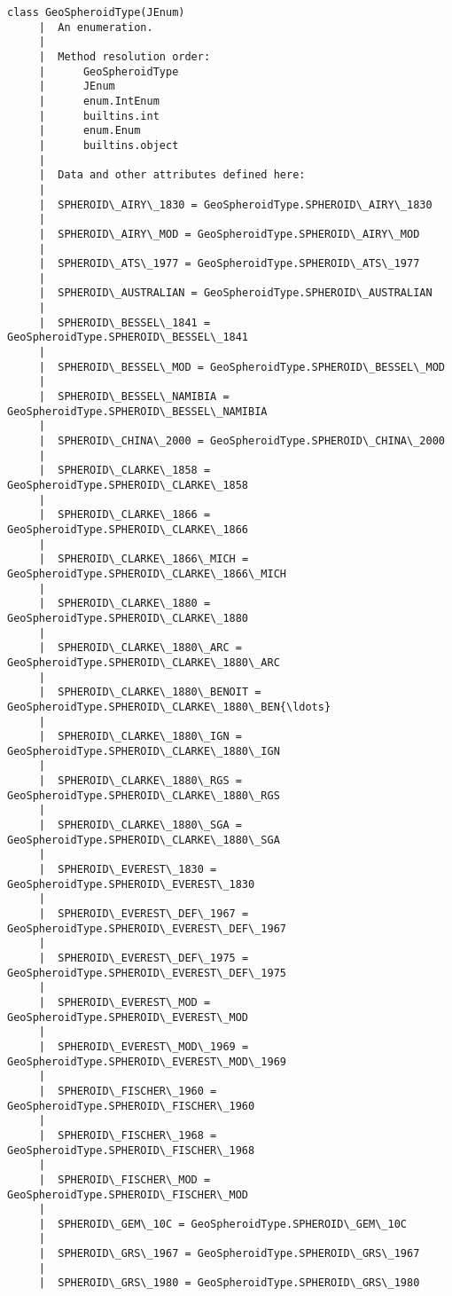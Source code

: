 \documentclass[11pt]{article}
\begin{document}
\begin{Verbatim}[commandchars=\\\{\}]
    class GeoSpheroidType(JEnum)
     |  An enumeration.
     |  
     |  Method resolution order:
     |      GeoSpheroidType
     |      JEnum
     |      enum.IntEnum
     |      builtins.int
     |      enum.Enum
     |      builtins.object
     |  
     |  Data and other attributes defined here:
     |  
     |  SPHEROID\_AIRY\_1830 = GeoSpheroidType.SPHEROID\_AIRY\_1830
     |  
     |  SPHEROID\_AIRY\_MOD = GeoSpheroidType.SPHEROID\_AIRY\_MOD
     |  
     |  SPHEROID\_ATS\_1977 = GeoSpheroidType.SPHEROID\_ATS\_1977
     |  
     |  SPHEROID\_AUSTRALIAN = GeoSpheroidType.SPHEROID\_AUSTRALIAN
     |  
     |  SPHEROID\_BESSEL\_1841 = GeoSpheroidType.SPHEROID\_BESSEL\_1841
     |  
     |  SPHEROID\_BESSEL\_MOD = GeoSpheroidType.SPHEROID\_BESSEL\_MOD
     |  
     |  SPHEROID\_BESSEL\_NAMIBIA = GeoSpheroidType.SPHEROID\_BESSEL\_NAMIBIA
     |  
     |  SPHEROID\_CHINA\_2000 = GeoSpheroidType.SPHEROID\_CHINA\_2000
     |  
     |  SPHEROID\_CLARKE\_1858 = GeoSpheroidType.SPHEROID\_CLARKE\_1858
     |  
     |  SPHEROID\_CLARKE\_1866 = GeoSpheroidType.SPHEROID\_CLARKE\_1866
     |  
     |  SPHEROID\_CLARKE\_1866\_MICH = GeoSpheroidType.SPHEROID\_CLARKE\_1866\_MICH
     |  
     |  SPHEROID\_CLARKE\_1880 = GeoSpheroidType.SPHEROID\_CLARKE\_1880
     |  
     |  SPHEROID\_CLARKE\_1880\_ARC = GeoSpheroidType.SPHEROID\_CLARKE\_1880\_ARC
     |  
     |  SPHEROID\_CLARKE\_1880\_BENOIT = GeoSpheroidType.SPHEROID\_CLARKE\_1880\_BEN{\ldots}
     |  
     |  SPHEROID\_CLARKE\_1880\_IGN = GeoSpheroidType.SPHEROID\_CLARKE\_1880\_IGN
     |  
     |  SPHEROID\_CLARKE\_1880\_RGS = GeoSpheroidType.SPHEROID\_CLARKE\_1880\_RGS
     |  
     |  SPHEROID\_CLARKE\_1880\_SGA = GeoSpheroidType.SPHEROID\_CLARKE\_1880\_SGA
     |  
     |  SPHEROID\_EVEREST\_1830 = GeoSpheroidType.SPHEROID\_EVEREST\_1830
     |  
     |  SPHEROID\_EVEREST\_DEF\_1967 = GeoSpheroidType.SPHEROID\_EVEREST\_DEF\_1967
     |  
     |  SPHEROID\_EVEREST\_DEF\_1975 = GeoSpheroidType.SPHEROID\_EVEREST\_DEF\_1975
     |  
     |  SPHEROID\_EVEREST\_MOD = GeoSpheroidType.SPHEROID\_EVEREST\_MOD
     |  
     |  SPHEROID\_EVEREST\_MOD\_1969 = GeoSpheroidType.SPHEROID\_EVEREST\_MOD\_1969
     |  
     |  SPHEROID\_FISCHER\_1960 = GeoSpheroidType.SPHEROID\_FISCHER\_1960
     |  
     |  SPHEROID\_FISCHER\_1968 = GeoSpheroidType.SPHEROID\_FISCHER\_1968
     |  
     |  SPHEROID\_FISCHER\_MOD = GeoSpheroidType.SPHEROID\_FISCHER\_MOD
     |  
     |  SPHEROID\_GEM\_10C = GeoSpheroidType.SPHEROID\_GEM\_10C
     |  
     |  SPHEROID\_GRS\_1967 = GeoSpheroidType.SPHEROID\_GRS\_1967
     |  
     |  SPHEROID\_GRS\_1980 = GeoSpheroidType.SPHEROID\_GRS\_1980

\end{Verbatim}
\end{document}
